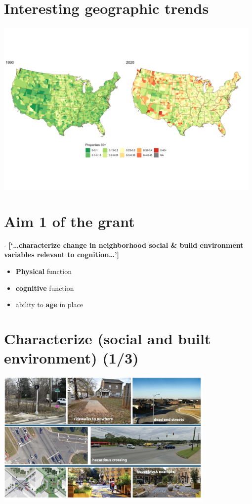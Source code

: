 \documentclass[
  letterpaper,
  DIV=11,
  numbers=noendperiod]{scrartcl}
\providecommand{\tightlist}{%
  \setlength{\itemsep}{0pt}\setlength{\parskip}{0pt}}\usepackage{longtable,booktabs,array}
\begin{document}
\hypertarget{interesting-geographic-trends}{%
\section{Interesting geographic
trends}\label{interesting-geographic-trends}}

\includegraphics[width=0.98\textwidth,height=\textheight]{imgs/combined60propB.png}

\hypertarget{aim-1-of-the-grant}{%
\section{Aim 1 of the grant}\label{aim-1-of-the-grant}}

{ - \textbf{{[}`\ldots characterize change in neighborhood social \&
build environment variables relevant to cognition\ldots{}'{]}}}

\begin{itemize}
\tightlist
\item
  \textbf{Physical} function
\item
  \textbf{cognitive} function
\item
  ability to \textbf{age} in place
\end{itemize}

\hypertarget{characterize-social-and-built-environment-13}{%
\section{Characterize (social and built environment)
(1/3)}\label{characterize-social-and-built-environment-13}}

\includegraphics[width=0.8\textwidth,height=\textheight]{imgs/connectedNeighborhoodsB.png}
\end{document}
